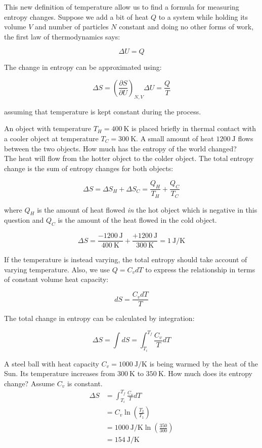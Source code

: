 \documentclass[12pt, a4paper]{article}
\newcounter{exa}
\begin{document}
This new definition of temperature allow us to find a formula for measuring entropy changes. Suppose we add a bit of heat $Q$ to a system while holding its volume $V$ and number of particles $N$ constant and doing no other forms of work, the first law of thermodynamics says:

\[\Delta U=Q\]

The change in entropy can be approximated using:

\[\Delta S=\left(\frac{\partial S}{\partial U}\right)_{N,V} \Delta U=\frac{Q}{T}\]

assuming that temperature is kept constant during the process.

\begin{texample}
An object with temperature $T_H=\SI{400}{\kelvin}$ is placed briefly in thermal contact with a cooler object at temperature $T_C=\SI{300}{\kelvin}$. A small amount of heat $\SI{1200}{\joule}$ flows between the two objects. How much has the entropy of the world changed? \\

The heat will flow from the hotter object to the colder object. The total entropy change is the sum of entropy changes for both objects:

\[\Delta S=\Delta S_H+\Delta S_C=\frac{Q_H}{T_H}+\frac{Q_C}{T_C}\]

where $Q_H$ is the amount of heat flowed \textit{in} the hot object which is negative in this question and $Q_C$ is the amount of the heat flowed in the cold object.

\[\Delta S=\frac{-\SI{1200}{\joule}}{\SI{400}{\kelvin}}+\frac{+\SI{1200}{\joule}}{\SI{300}{\kelvin}}=\SI{1}{\joule\per\kelvin}\]
\end{texample}

If the temperature is instead varying, the total entropy should take account of varying temperature. Also, we use $Q=C_vdT$ to express the relationship in terms of constant volume heat capacity:

\[dS=\frac{C_vdT}{T}\]

The total change in entropy can be calculated by integration:

\[\Delta S=\int dS=\int_{T_i}^{T_f} \frac{C_v}{T} dT\]

\begin{texample}
A steel ball with heat capacity $C_v=\SI{1000}{\joule\per\kelvin}$ is being warmed by the heat of the Sun. Its temperature increases from $\SI{300}{\kelvin}$ to $\SI{350}{\kelvin}$. How much does its entropy change? Assume $C_v$ is constant. \\

\begin{align*}
\Delta S&=\int_{T_i}^{T_f} \frac{C_v}{T} dT \\
&=C_v \ln\left( \frac{T_2}{T_1} \right) \\
&=\SI{1000}{\joule\per\kelvin} \ln\left( \frac{350}{300} \right) \\
&=\SI{154}{\joule\per\kelvin}
\end{align*}
\end{texample}
\end{document}
